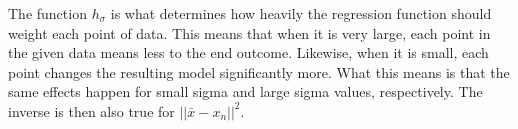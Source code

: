 The function $h_\sigma$ is what determines how heavily the regression function should weight each point of data. This means that when it is very large, each point in the given data means less to the end outcome. Likewise, when it is small, each point changes the resulting model significantly more. What this means is that the same effects happen for small sigma and large sigma values, respectively. The inverse is then also true for $||\bar{x}-x_n||^2$.
